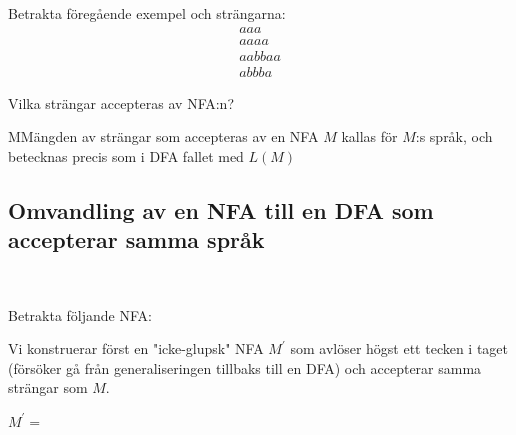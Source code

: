 \noindent Betrakta föregående exempel och strängarna:
\begin{equation*}
  \begin{gathered}
    aaa\\
    aaaa\\
    aabbaa\\
    abbba
  \end{gathered}
\end{equation*}\par
\noindent Vilka strängar accepteras av NFA:n?
\par\bigskip
\begin{theo}
  MMängden av strängar som accepteras av en NFA $M$ kallas för $M$:s språk, och betecknas precis som i DFA fallet med $L(M)$
\end{theo}
\newpage
\subsection{Omvandling av en NFA till en DFA som accepterar samma språk}\hfill\\\par
\noindent Betrakta följande NFA:
\begin{figure}[ht]
    \centering
    \caption{}
\end{figure}\par
\noindent Vi konstruerar först en "icke-glupsk" NFA $M^{\prime}$ som avlöser högst ett tecken i taget (försöker gå från generaliseringen tillbaks till en DFA) och accepterar samma strängar som $M$.\par
\noindent $M^{\prime} = $
